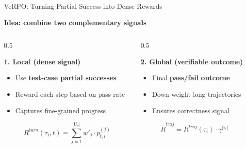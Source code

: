 \documentclass[
  english,            %
  aspectratio=169,    %
]{tumbeamer}
\begin{document}
\begin{frame}{VeRPO: Turning Partial Success into Dense Rewards}

\textbf{Idea: combine two complementary signals}

\vspace{2mm}

\begin{columns}[t] %

\begin{column}{0.5\textwidth}
\raggedright %

\textbf{1. Local (dense signal)}

\begin{itemize}
    \item Use \textbf{test-case partial successes}
    \item Reward each step based on pass rate
    \item Captures fine-grained progress
\end{itemize}

\vspace{2mm}

\begin{flushleft}
\[
R^{turn}(\tau_i,t)
= \sum^{|U_x|}_{j=1} w'_j \cdot p^{(j)}_{t,i}
\]
\end{flushleft}

\end{column}

\begin{column}{0.5\textwidth}
\raggedright %

\textbf{2. Global (verifiable outcome)}

\begin{itemize}
    \item Final \textbf{pass/fail outcome}
    \item Down-weight long trajectories
    \item Ensures correctness signal
\end{itemize}

\vspace{2mm}

\begin{flushleft}
\[
\tilde{R}^{traj}
= R^{traj}(\tau_i)\cdot \gamma^{|\tau_i|}
\]
\end{flushleft}

\end{column}

\end{columns}

\end{frame}
\end{document}
